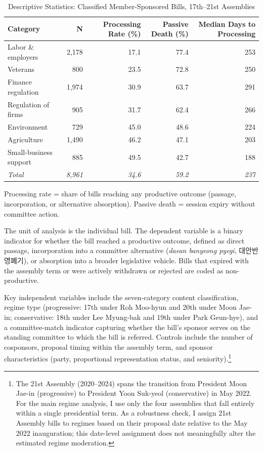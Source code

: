 \documentclass[11pt]{article}
\begin{document}
\begin{table}[htbp]
\centering
\begin{threeparttable}
\caption{Descriptive Statistics: Classified Member-Sponsored Bills, 17th--21st Assemblies}
\label{tab:desc}
\begin{tabular}{lrrrr}
\toprule
Category & N & Processing Rate (\%) & Passive Death (\%) & Median Days to Processing \\
\midrule
Labor \& employers      & 2,178 & 17.1 & 77.4 & 253 \\
Veterans                 &   800 & 23.5 & 72.8 & 250 \\
Finance regulation       & 1,974 & 30.9 & 63.7 & 291 \\
Regulation of firms      &   905 & 31.7 & 62.4 & 266 \\
Environment              &   729 & 45.0 & 48.6 & 224 \\
Agriculture              & 1,490 & 46.2 & 47.1 & 203 \\
Small-business support   &   885 & 49.5 & 42.7 & 188 \\
\midrule
\textit{Total}           & \textit{8,961} & \textit{34.6} & \textit{59.2} & \textit{237} \\
\bottomrule
\end{tabular}
\begin{tablenotes}
\footnotesize
\item Processing rate = share of bills reaching any productive outcome (passage, incorporation, or alternative absorption). Passive death = session expiry without committee action.
\end{tablenotes}
\end{threeparttable}
\end{table}

The unit of analysis is the individual bill. The dependent variable is a binary indicator for whether the bill reached a productive outcome, defined as direct passage, incorporation into a committee alternative (\textit{daean banyeong pyegi}, 대안반영폐기), or absorption into a broader legislative vehicle. Bills that expired with the assembly term or were actively withdrawn or rejected are coded as non-productive.

Key independent variables include the seven-category content classification, regime type (progressive: 17th under Roh Moo-hyun and 20th under Moon Jae-in; conservative: 18th under Lee Myung-bak and 19th under Park Geun-hye), and a committee-match indicator capturing whether the bill's sponsor serves on the standing committee to which the bill is referred. Controls include the number of cosponsors, proposal timing within the assembly term, and sponsor characteristics (party, proportional representation status, and seniority).\footnote{The 21st Assembly (2020--2024) spans the transition from President Moon Jae-in (progressive) to President Yoon Suk-yeol (conservative) in May 2022. For the main regime analysis, I use only the four assemblies that fall entirely within a single presidential term. As a robustness check, I assign 21st Assembly bills to regimes based on their proposal date relative to the May 2022 inauguration; this date-level assignment does not meaningfully alter the estimated regime moderation.}
\end{document}
